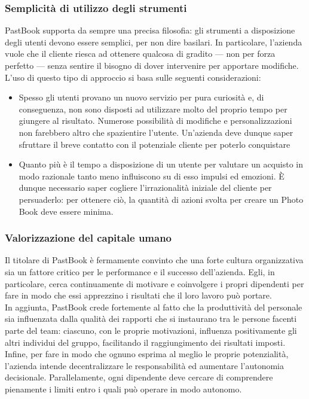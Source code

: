 			\subsubsection{Semplicità di utilizzo degli strumenti}
				PastBook supporta da sempre una precisa filosofia: gli strumenti a disposizione degli utenti devono essere semplici,
				per non dire basilari. In particolare, l'azienda vuole che il cliente riesca ad ottenere qualcosa di gradito — non
				per forza perfetto — senza sentire il bisogno di dover intervenire per apportare modifiche.\\
				L'uso di questo tipo di approccio si basa sulle seguenti considerazioni:
				\begin{itemize}
					\item Spesso gli utenti provano un nuovo servizio per pura curiosità e, di conseguenza, non sono disposti ad
					utilizzare molto del proprio tempo per giungere al risultato. Numerose possibilità di modifiche e
					personalizzazioni non farebbero altro che spazientire l'utente. Un'azienda deve dunque saper sfruttare il
					breve contatto con il potenziale cliente per poterlo conquistare
					\item Quanto più è il tempo a disposizione di un utente per valutare un acquisto in modo razionale tanto
					meno influiscono su di esso impulsi ed emozioni. È dunque necessario saper cogliere l'irrazionalità iniziale
					del cliente per persuaderlo: per ottenere ciò, la quantità di azioni svolta per creare un Photo Book deve
					essere minima.
				\end{itemize}
			\subsubsection{Valorizzazione del capitale umano}
				Il titolare di PastBook è fermamente convinto che una forte cultura organizzativa sia un fattore critico per le
				performance e il successo dell'azienda. Egli, in particolare, cerca continuamente di motivare e coinvolgere i propri
				dipendenti per fare in modo che essi apprezzino i risultati che il loro lavoro può portare.\\
				In aggiunta, PastBook crede fortemente al fatto che la produttività del personale sia influenzata dalla qualità dei
				rapporti che si instaurano tra le persone facenti parte del team: ciascuno, con le proprie motivazioni, influenza
				positivamente gli altri individui del gruppo, facilitando il raggiungimento dei risultati imposti.\\
				
				Infine, per fare in modo che ognuno esprima al meglio le proprie potenzialità, l'azienda intende decentralizzare le
				responsabilità ed aumentare l'autonomia decisionale. Parallelamente, ogni dipendente deve cercare di comprendere
				pienamente i limiti entro i quali può operare in modo autonomo.
